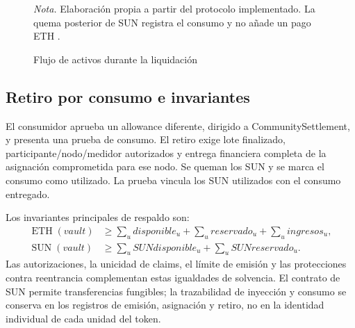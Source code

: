 \begin{figure}[htbp]
\caption{Flujo de activos durante la liquidación}\label{fig:activos}

\centering
{}
\par\noindent\small\textit{Nota.} Elaboración propia a partir del protocolo implementado. La quema posterior de SUN registra el consumo y no añade un pago ETH \citep{settlement}.

\end{figure}

\subsection{Retiro por consumo e invariantes}
El consumidor aprueba un allowance diferente, dirigido a CommunitySettlement, y presenta una prueba de consumo. El retiro exige lote finalizado, participante/nodo/medidor autorizados y entrega financiera completa de la asignación comprometida para ese nodo. Se queman los SUN y se marca el consumo como utilizado. La prueba vincula los SUN utilizados con el consumo entregado.

Los invariantes principales de respaldo son:
\begin{align}
\operatorname{ETH}(vault)&\geq \sum_u disponible_u+\sum_u reservado_u+\sum_u ingresos_u,\\
\operatorname{SUN}(vault)&\geq \sum_u SUNdisponible_u+\sum_u SUNreservado_u.
\end{align}
Las autorizaciones, la unicidad de claims, el límite de emisión y las protecciones contra reentrancia complementan estas igualdades de solvencia. El contrato de SUN permite transferencias fungibles; la trazabilidad de inyección y consumo se conserva en los registros de emisión, asignación y retiro, no en la identidad individual de cada unidad del token.
